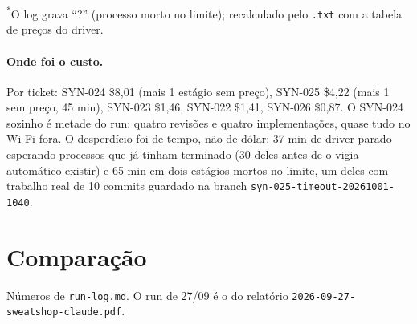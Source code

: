 \documentclass[11pt,a4paper]{article}
\begin{document}
\smallskip
{\footnotesize \textsuperscript{*}O log grava ``?'' (processo morto no limite);
recalculado pelo \texttt{.txt} com a tabela de preços do driver.}

\bigskip
\begin{center}
\end{center}

\paragraph{Onde foi o custo.} Por ticket: SYN-024 \$8,01 (mais 1 estágio sem
preço), SYN-025 \$4,22 (mais 1 sem preço, 45 min), SYN-023 \$1,46, SYN-022
\$1,41, SYN-026 \$0,87. O SYN-024 sozinho é metade do run: quatro revisões e
quatro implementações, quase tudo no Wi-Fi fora. O desperdício foi de tempo,
não de dólar: 37 min de driver parado esperando processos que já tinham
terminado (30 deles antes de o vigia automático existir) e 65 min em dois
estágios mortos no limite, um deles com trabalho real de 10 commits guardado
na branch \texttt{syn-025-timeout-20261001-1040}.

\section{Comparação}

Números de \texttt{run-log.md}. O run de 27/09 é o do relatório
\texttt{2026-09-27-sweatshop-claude.pdf}.
\end{document}
